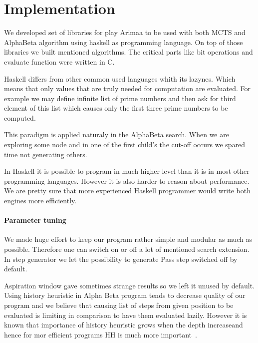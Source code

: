 \chapter{Implementation}
We developed set of libraries for play Arimaa to be used with both MCTS and
AlphaBeta algorithm using haskell as programming language. On top of those
libraries we built mentioned algorithms. The critical parts like bit operations
and evaluate function were written in C.

Haskell differs from other common used languages whith its lazynes. Which means
that only values that are truly needed for computation are evaluated. For
example we may define infinite list of prime numbers and then ask for third
element of this list which causes only the first three prime numbers to be
computed.

This paradigm is applied naturaly in the AlphaBeta search. When we are
exploring some node and in one of the first child's the cut-off occurs we
spared time not generating others.


In Haskell it is possible to program in much higher level than it is in most
other programming languages. However it is also harder to reason about
performance. We are pretty sure that more experienced Haskell programmer would
write both engines more efficiently.

\subsubsection{Parameter tuning}

We made huge effort to keep our program rather simple and modular as much as
possible. Therefore one can switch on or off a lot of mentioned search
extension. In step generator we let the possibility to generate Pass step
switched off by default.

Aspiration window gave sometimes strange results so we left it unused by default.
Using history heuristic in Alpha Beta program tends to decrease quality of our
program and we believe that causing list of steps from given position to be
evaluated is limiting in comparison to have them evaluated lazily. However it
is known that importance of history heuristic grows when the depth increaseand
hence for mor efficient programs HH is much more important~\cite{ZHONG}.

